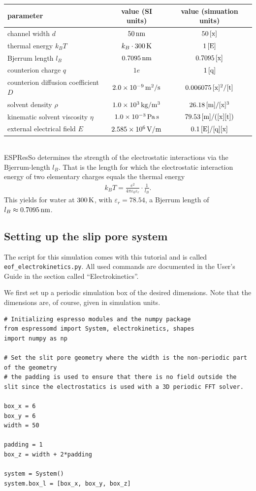 \begin{tabular}[h]{|l|c|c|}
\hline
parameter & value (SI units) & value (simuation units)\\
\hline\hline
channel width $d$ & $50\,\mathrm{nm}$ & $50\,\mathrm{[x]}$\\
\hline
thermal energy $k_B T$ & $k_B\cdot300\,\mathrm{K}$ & $1\,\mathrm{[E]}$\\
\hline
Bjerrum length $l_B$ & $0.7095\,\mathrm{nm}$ & $0.7095\,\mathrm{[x]}$\\
\hline
counterion charge $q$ & $1e$ & $1\,\mathrm{[q]}$\\
\hline
counterion diffusion coefficient $D$ & $2.0\times 10^{-9}\,\mathrm{m^2/s}$ & $0.006075\,\mathrm{[x]^2/[t]}$\\
\hline
solvent density $\rho$ & $1.0\times 10^{3}\,\mathrm{kg/m^3}$ & $26.18\,\mathrm{[m]/[x]^3}$\\
\hline
kinematic solvent viscosity $\eta$ & $1.0\times 10^{-3}\,\mathrm{Pa}\,\mathrm{s}$ & $79.53\,\mathrm{[m]/([x][t])}$\\
\hline
external electrical field $E$ & $2.585\times 10^{6}\,\mathrm{V/m}$ & $0.1\,\mathrm{[E]/[q][x]}$\\
\hline
\end{tabular}
\\

ESPResSo determines the strength of the electrostatic interactions via the Bjerrum-length $l_B$. That is the length for which the electrostatic interaction energy of two elementary charges equals the thermal energy
%
\begin{align*}
k_B T=\frac{e^2}{4\pi\varepsilon_0\varepsilon_r}\cdot\frac 1 {l_B}.
\end{align*}
%
This yields for water at $300\,\mathrm{K}$, with $\varepsilon_r = 78.54$, a Bjerrum length of $l_B\approx0.7095\,\mathrm{nm}$.


\subsection{Setting up the slip pore system}

The script for this simulation comes with this tutorial and is called \texttt{eof\_electrokinetics.py}. All used commands are documented in the User's Guide in the section called ``Electrokinetics''.

We first set up a periodic simulation box of the desired dimensions. Note that the dimensions are, of course, given in simulation units.

\begin{lstlisting}
# Initializing espresso modules and the numpy package
from espressomd import System, electrokinetics, shapes
import numpy as np

# Set the slit pore geometry where the width is the non-periodic part of the geometry
# the padding is used to ensure that there is no field outside the slit since the electrostatics is used with a 3D periodic FFT solver.

box_x = 6
box_y = 6
width = 50

padding = 1
box_z = width + 2*padding

system = System()
system.box_l = [box_x, box_y, box_z]
\end{lstlisting}

